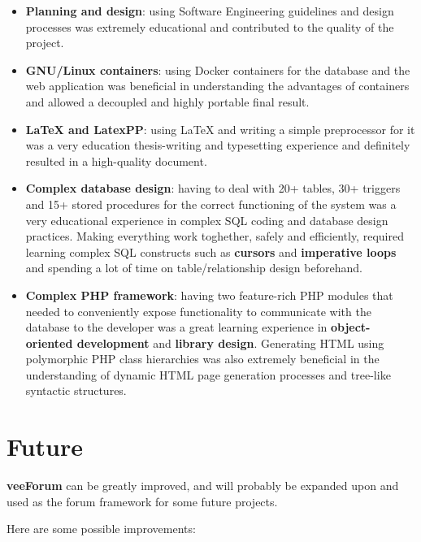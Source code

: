 \documentclass[12pt]{report}
\renewcommand\emph{\textbf}
\begin{document}
            \begin{itemize}
                \item \emph{Planning and design}: using Software Engineering guidelines and design processes was extremely educational and contributed to the quality of the project.
                \item \emph{GNU/Linux containers}: using Docker containers for the database and the web application was beneficial in understanding the advantages of containers and allowed a decoupled and highly portable final result.
                \item \emph{\LaTeX{} and LatexPP}: using \LaTeX{} and writing a simple preprocessor for it was a very education thesis-writing and typesetting experience and definitely resulted in a high-quality document.
                \item \emph{Complex database design}: having to deal with 20+ tables, 30+ triggers and 15+ stored procedures for the correct functioning of the system was a very educational experience in complex SQL coding and database design practices. Making everything work toghether, safely and efficiently, required learning complex SQL constructs such as \emph{cursors} and \emph{imperative loops} and spending a lot of time on table/relationship design beforehand.
                \item \emph{Complex PHP framework}: having two feature-rich PHP modules that needed to conveniently expose functionality to communicate with the database to the developer was a great learning experience in \emph{object-oriented development} and \emph{library design}. Generating HTML using polymorphic PHP class hierarchies was also extremely beneficial in the understanding of dynamic HTML page generation processes and tree-like syntactic structures.
            \end{itemize}

        \chapter{Future}
            
            \emph{veeForum} can be greatly improved, and will probably be expanded upon and used as the forum framework for some future projects.

                Here are some possible improvements:
\end{document}
